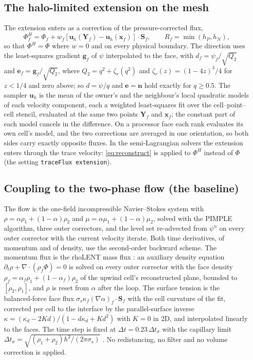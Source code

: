\documentclass[preprint,3p,11pt]{elsarticle}
\newcommand{\psilev}{\psi}
\newcommand{\nhat}{\mathbf{n}}
\newcommand{\bu}{\mathbf{u}}
\newcommand{\bx}{\mathbf{x}}
\begin{document}
\subsection{The halo-limited extension on the mesh}
\label{sec:fv-hl}
The extension enters as a correction of the pressure-corrected flux,
\begin{equation}
  \Phi^H_f=\Phi_f+w_f\left[\bu_h(\mathbf Y_f)-\bu_h(\bx_f)\right]\cdot\mathbf S_f,
  \qquad R_f=\min(h_P,h_N),
  \label{eq:hlFlux}
\end{equation}
so that $\Phi^H=\Phi$ where $w=0$ and on every physical boundary. The direction uses
the least-squares gradient $\mathbf g_f$ of $\psilev$ interpolated to the face, with
$d_f=\psilev_f/\sqrt{Q_2}$ and $\mathbf e_f=\mathbf g_f/\sqrt{Q_2}$, where
$Q_2=q^2+\zeta_r(q^2)$ and $\zeta_r(z)=(1-4z)^3/4$ for $z<1/4$ and zero above; so $d=\psilev/q$
and $\mathbf e=\nhat$ hold exactly for $q\ge0.5$. The sampler $\bu_h$ is the mean of
the owner's and the neighbour's local quadratic models of each velocity component, each
a weighted least-squares fit over the cell--point--cell stencil, evaluated at the same
two points $\mathbf Y_f$ and $\bx_f$; the constant part of each model cancels in the
difference. On a processor face each rank evaluates its own cell's model, and the two
corrections are averaged in one orientation, so both sides carry exactly opposite
fluxes. In the semi-Lagrangian solvers the extension enters through the trace velocity:
\eqref{eq:reconstruct} is applied to $\Phi^H$ instead of $\Phi$ (the setting
\texttt{traceFlux extension}).

\subsection{Coupling to the two-phase flow (the baseline)}
\label{sec:fv-coupling}
The flow is the one-field incompressible Navier--Stokes system with
$\rho=\alpha\rho_1+(1-\alpha)\rho_2$ and $\mu=\alpha\mu_1+(1-\alpha)\mu_2$, solved with
the PIMPLE algorithm, three outer correctors, and the level set re-advected from
$\psilev^n$ on every outer corrector with the current velocity iterate. Both time
derivatives, of momentum and of density, use the second-order backward scheme. The
momentum flux is the rhoLENT mass flux \cite{LiuEtAl2023}: an auxiliary density
equation $\partial_t\rho+\nabla\cdot(\rho_f\Phi)=0$ is solved on every outer corrector
with the face density $\rho_f=\alpha_f\rho_1+(1-\alpha_f)\rho_2$ of the upwind cell's
reconstructed plane, bounded to $[\rho_2,\rho_1]$, and $\rho$ is reset from $\alpha$
after the loop. The surface tension is the balanced-force face flux
$\sigma_s\kappa_f(\nabla\alpha)_f\cdot\mathbf S_f$ \cite{Francois2006,Popinet2009} with
the cell curvature of the fit, corrected per cell to the interface by the
parallel-surface inverse $\kappa=(\kappa_d-2Kd)/(1-d\kappa_d+Kd^2)$ with $K=0$ in 2D,
and interpolated linearly to the faces. The time step is fixed at
$\Delta t=0.23\,\Delta t_\sigma$ with the capillary limit
$\Delta t_\sigma=\sqrt{(\rho_1+\rho_2)h^3/(2\pi\sigma_s)}$ \cite{Brackbill1992}. No
redistancing, no filter and no volume correction is applied.
\end{document}
